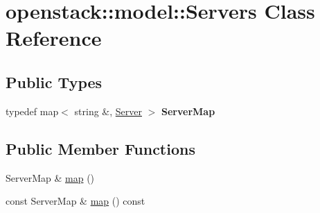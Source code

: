 \hypertarget{classopenstack_1_1model_1_1Servers}{
\section{openstack::model::Servers Class Reference}
\label{classopenstack_1_1model_1_1Servers}
}
\subsection*{Public Types}
\begin{DoxyCompactItemize}
\item 
\hypertarget{classopenstack_1_1model_1_1Servers_a59af1261f73223d3c2077fac04ba7cca}{
typedef map$<$ string \&, \hyperlink{classopenstack_1_1model_1_1Server}{Server} $>$ {\bfseries ServerMap}}
\label{classopenstack_1_1model_1_1Servers_a59af1261f73223d3c2077fac04ba7cca}

\end{DoxyCompactItemize}
\subsection*{Public Member Functions}
\begin{DoxyCompactItemize}
\item 
ServerMap \& \hyperlink{classopenstack_1_1model_1_1Servers_ac92a5889e6b06a5fe27ea8005624cb9c}{map} ()
\item 
const ServerMap \& \hyperlink{classopenstack_1_1model_1_1Servers_a322c62552806483d3d304255f9892f50}{map} () const 
\end{DoxyCompactItemize}


